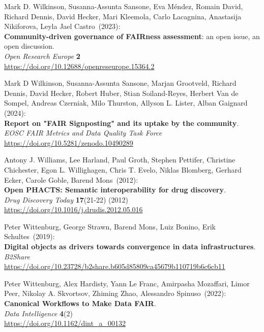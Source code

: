 \begin{thebibliography}{9}
Mark D. Wilkinson, Susanna-Assunta Sansone, Eva Méndez, Romain David, Richard Dennis, David Hecker, Mari Kleemola, Carlo Lacagnina, Anastasija Nikiforova, Leyla Jael Castro~(2023): \\
\textbf{Community-driven governance of FAIRness assessment}: an open issue, an open discussion.\\
\emph{Open Research Europe} \textbf{2}\\
\url{https://doi.org/10.12688/openreseurope.15364.2}

Mark D Wilkinson, Susanna-Assunta Sansone, Marjan Grootveld, Richard Dennis, David Hecker, Robert Huber, Stian Soiland-Reyes, Herbert Van de Sompel, Andreas Czerniak, Milo Thurston, Allyson L. Lister, Alban Gaignard (2024):\\  \textbf{Report on "FAIR Signposting" and its uptake by the community}.\\
\emph{EOSC FAIR Metrics and Data Quality Task Force} \\
\url{https://doi.org/10.5281/zenodo.10490289}

Antony J. Williams, Lee Harland, Paul Groth, Stephen Pettifer, Christine Chichester, Egon L. Willighagen, Chris T. Evelo, Niklas Blomberg, Gerhard Ecker, Carole Goble, Barend Mons~(2012): \\
\textbf{Open {PHACTS}: Semantic interoperability for drug discovery}.\\
\emph{Drug Discovery Today} \textbf{17}(21-22) (2012) \\
\url{https://doi.org/10.1016/j.drudis.2012.05.016}

Peter Wittenburg, George Strawn, Barend Mons, Luiz Bonino, Erik Schultes~(2019): \\
\textbf{Digital objects as drivers towards convergence in data infrastructures}. \\
\emph{B2Share}\\
\url{https://doi.org/10.23728/b2share.b605d85809ca45679b110719b6c6cb11}

Peter Wittenburg, Alex Hardisty, Yann Le Franc, Amirpasha Mozaffari, Limor Peer, Nikolay A. Skvortsov, Zhiming Zhao, Alessandro Spinuso~(2022): \\
\textbf{Canonical Workflows to Make Data FAIR}.\\
\emph{Data Intelligence} \textbf{4}(2)\\
\url{https://doi.org/10.1162/dint_a_00132}


\end{thebibliography}
